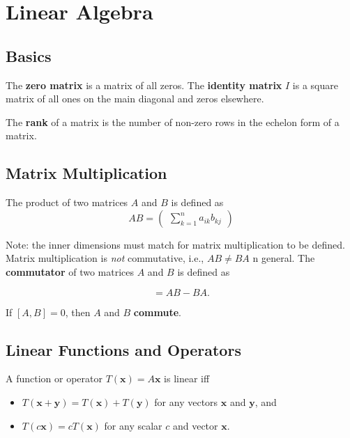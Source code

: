\section{Linear Algebra}

\subsection{Basics}

The \textbf{zero matrix} is a matrix of all zeros. The \textbf{identity matrix} $I$ is a square matrix of all ones on the main diagonal and zeros elsewhere.

The \textbf{rank} of a matrix is the number of non-zero rows in the echelon form of a matrix.

\subsection{Matrix Multiplication}

The product of two matrices $A$ and $B$ is defined as
\begin{equation*}
    AB = \begin{pmatrix}
        \sum_{k=1}^n a_{ik}b_{kj}
    \end{pmatrix}
\end{equation*}

Note: the inner dimensions must match for matrix multiplication to be defined. Matrix multiplication is \emph{not} commutative, i.e., $AB \neq BA$ n general. The \textbf{commutator} of two matrices $A$ and $B$ is defined as

\begin{equation*}
    [A, B] = AB - BA\text{.}
\end{equation*}

If $[A, B] = 0$, then $A$ and $B$ \textbf{commute}.

\subsection{Linear Functions and Operators}

A function or operator $T(\mathbf{x}) = A\mathbf{x}$ is linear iff

\begin{itemize}
    \item $T(\mathbf{x} + \mathbf{y}) = T(\mathbf{x}) + T(\mathbf{y})$ for any vectors $\mathbf{x}$ and $\mathbf{y}$, and
    \item $T(c\mathbf{x}) = cT(\mathbf{x})$ for any scalar $c$ and vector $\mathbf{x}$.
\end{itemize}

